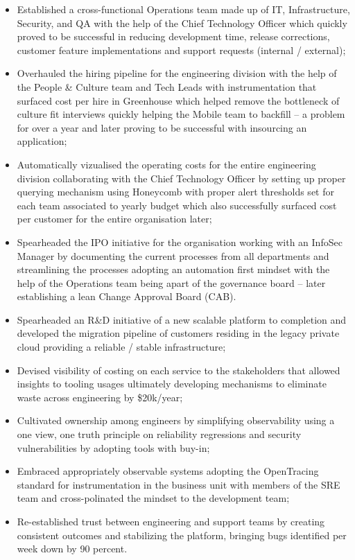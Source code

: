 \documentclass[11pt,a4paper,nolmodern,colorlinks=true,linkcolor=true]{moderncv}
\begin{document}
%
  {
    \begin{itemize}
      \item Established a cross-functional Operations team made up of IT, Infrastructure, Security, and QA with the help of the Chief Technology Officer which quickly proved to be successful in reducing development time, release corrections, customer feature implementations and support requests (internal / external);
      \item Overhauled the hiring pipeline for the engineering division with the help of the People \& Culture team and Tech Leads with instrumentation that surfaced cost per hire in Greenhouse which helped remove the bottleneck of culture fit interviews quickly helping the Mobile team to backfill -- a problem for over a year and later proving to be successful with insourcing an application;
      \item Automatically vizualised the operating costs for the entire engineering division collaborating with the Chief Technology Officer by setting up proper querying mechanism using Honeycomb with proper alert thresholds set for each team associated to yearly budget which also successfully surfaced cost per customer for the entire organisation later;
      \item Spearheaded the IPO initiative for the organisation working with an InfoSec Manager by documenting the current processes from all departments and streamlining the processes adopting an automation first mindset with the help of the Operations team being apart of the governance board -- later establishing a lean Change Approval Board (CAB).
    \end{itemize}
}

%
  {
    \begin{itemize}
      \item Spearheaded an R\&D initiative of a new scalable platform to completion and developed the migration pipeline of customers residing in the legacy private cloud providing a reliable / stable infrastructure;
      \item Devised visibility of costing on each service to the stakeholders that allowed insights to tooling usages ultimately developing mechanisms to eliminate waste across engineering by \$20k/year;
      \item Cultivated ownership among engineers by simplifying observability using a one view, one truth principle on reliability regressions and security vulnerabilities by adopting tools with buy-in;
      \item Embraced appropriately observable systems adopting the OpenTracing standard for instrumentation in the business unit with members of the SRE team and cross-polinated the mindset to the development team;
      \item Re-established trust between engineering and support teams by creating consistent outcomes and stabilizing the platform, bringing bugs identified per week down by 90 percent.
    \end{itemize}
}
\end{document}
